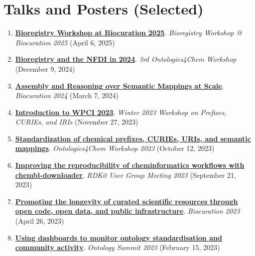 \documentclass[10pt,a4paper,sans]{moderncv} %
\begin{document}
\section{Talks and Posters (Selected)}\label{sec:talks-and-posters}
\begin{enumerate}
\itemsep0.5em
    \item \textbf{\href{https://doi.org/10.5281/zenodo.15184414}{Bioregistry Workshop at Biocuration 2025}}. \textit{Bioregistry Workshop @ Biocuration 2025} (April 6, 2025)

    \item \textbf{\href{https://bit.ly/bioregistry-ontologies4chem-2024}{Bioregistry and the NFDI in 2024}}. \textit{3rd Ontologies4Chem Workshop} (December 9, 2024)

    \item \textbf{\href{https://bit.ly/biocuration2024-cth}{Assembly and Reasoning over Semantic Mappings at Scale}}. \textit{Biocuration 2024} (March 7, 2024)

    \item \textbf{\href{https://docs.google.com/presentation/d/1SJ-gyoctyX-WLkkULRkUDF25l5CmtZZG3xlWBegDRa8/edit?usp=sharing}{Introduction to WPCI 2023}}. \textit{Winter 2023 Workshop on Prefixes, CURIEs, and IRIs} (November 27, 2023)

    \item \textbf{\href{https://bit.ly/ontologies4chem2023-cth}{Standardization of chemical prefixes, CURIEs, URIs, and semantic mappings}}. \textit{Ontologies4Chem Workshop 2023} (October 12, 2023)

    \item \textbf{\href{https://bit.ly/cth-rdkit-ugm-2023}{Improving the reproducibility of cheminformatics workflows with chembl-downloader}}. \textit{RDKit User Group Meeting 2023} (September 21, 2023)

    \item \textbf{\href{https://docs.google.com/presentation/d/1hEryoMNyp8gwt2pvPy2ErKaw_QPvnWOmzPT0Sn4Yl4s/edit?usp=sharing}{Promoting the longevity of curated scientific resources through open code, open data, and public infrastructure}}. \textit{Biocuration 2023} (April 26, 2023)

    \item \textbf{\href{https://docs.google.com/presentation/d/1oKxBzSCZGuFlIhw6jAXw00xgEGs7KgmaVR54NEdPprw/edit?usp=sharing}{Using dashboards to monitor ontology standardisation and community activity}}. \textit{Ontology Summit 2023} (February 15, 2023)


\end{enumerate}
\end{document}
